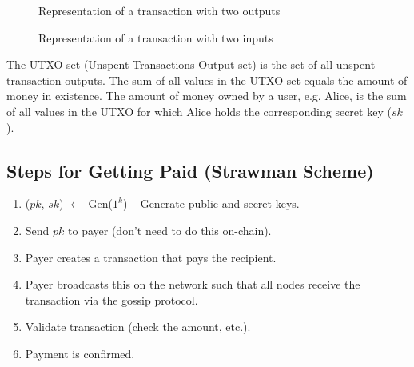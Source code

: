 \begin{figure}[h]
\begin{center}
\end{center}
\caption{Representation of a transaction with two outputs}
\label{fig:tx_model}
\end{figure}

\begin{figure}[h]
\begin{center}
\end{center}
\caption{Representation of a transaction with two inputs}
\label{fig:tx_model}
\end{figure}

The UTXO set (Unspent Transactions Output set) is the set of all unspent transaction outputs. The sum of all values in the UTXO set equals the amount of money in existence. The amount of money owned by a user, e.g. Alice, is the sum of all values in the UTXO for which Alice holds the corresponding secret key ($sk$).

\subsection{Steps for Getting Paid (Strawman Scheme)}
\begin{enumerate}
    \item ($pk$, $sk$) $\leftarrow$ Gen($1^k$) -- Generate public and secret keys.
    \item Send $pk$ to payer (don't need to do this on-chain).
    \item Payer creates a transaction that pays the recipient.
    \item Payer broadcasts this on the network such that all nodes receive the transaction via the gossip protocol.
    \item Validate transaction (check the amount, etc.).
    \item Payment is confirmed.
\end{enumerate}

